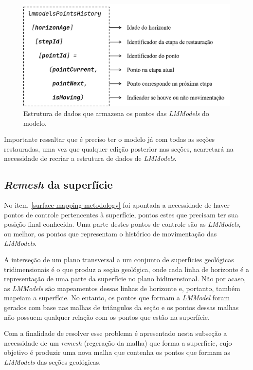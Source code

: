 \begin{figure} [H]
  \begin{center}
    \includegraphics[width=350pt]{images/fig-lmm-data-structure}
    \caption{Estrutura de dados que armazena os pontos das \textit{LMModels} do modelo.}\label{fig-lmm-data-structure}
  \end{center}
\end{figure}

Importante ressaltar que é preciso ter o modelo já com todas as seções restauradas, uma vez que qualquer edição posterior nas seções, acarretará na necessidade de recriar a estrutura de dados de \textit{LMModels}.

\subsection{\textit{Remesh} da superfície}\label{surface-remesh}

No item~\ref{surface-mapping-metodology} foi apontada a necessidade de haver pontos de controle pertencentes à superfície, pontos estes que precisam ter sua posição final conhecida. Uma parte destes pontos de controle são as \textit{LMModels}, ou melhor, os pontos que representam o histórico de movimentação das \textit{LMModels}.

A interseção de um plano transversal a um conjunto de superfícies geológicas tridimensionais é o que produz a seção geológica, onde cada linha de horizonte é a representação de uma parte da superfície no plano bidimensional. Não por acaso, as \textit{LMModels} são mapeamentos dessas linhas de horizonte e, portanto, também mapeiam a superfície. No entanto, os pontos que formam a \textit{LMModel} foram gerados com base nas malhas de triângulos da seção e os pontos dessas malhas não possuem qualquer relação com os pontos que estão na superfície.

Com a finalidade de resolver esse problema é apresentado nesta subseção a necessidade de um \textit{remesh} (regeração da malha) que forma a superfície, cujo objetivo é produzir uma nova malha que contenha os pontos que formam as \textit{LMModels} das seções geológicas.

